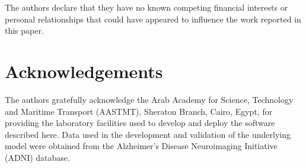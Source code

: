 \documentclass[5p,times,twocolumn]{elsarticle}
\begin{document}
The authors declare that they have no known competing financial interests or personal relationships that could have appeared to influence the work reported in this paper.

\section*{Acknowledgements}

The authors gratefully acknowledge the Arab Academy for Science, Technology and Maritime Transport (AASTMT), Sheraton Branch, Cairo, Egypt, for providing the laboratory facilities used to develop and deploy the software described here. Data used in the development and validation of the underlying model were obtained from the Alzheimer's Disease Neuroimaging Initiative (ADNI) database.
\end{document}
